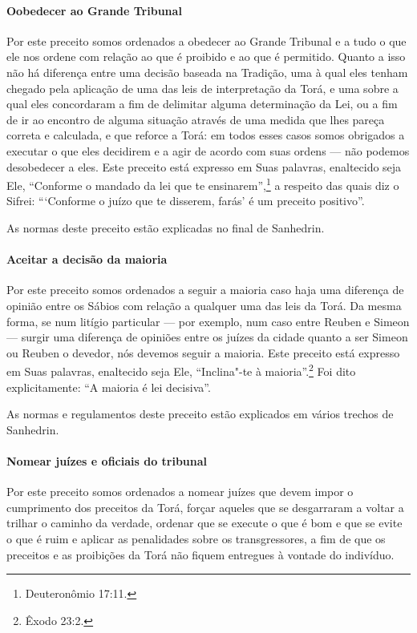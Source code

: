 \begin{multicols}{2}
\paragraph{Oobedecer ao Grande Tribunal}

Por este preceito somos ordenados a obedecer ao Grande Tribunal e a tudo
o que ele nos ordene com relação ao que é proibido e ao que é permitido. Quanto a isso não há diferença entre uma decisão baseada na
Tradição, uma à qual eles tenham chegado pela aplicação de uma das leis
de interpretação da Torá\starr, e uma sobre a qual eles concordaram a fim de
delimitar alguma determinação da Lei, ou a fim de ir ao encontro de
alguma situação através de uma medida que lhes pareça correta e
calculada, e que reforce a Torá\starr: em todos esses casos somos obrigados a
executar o que eles decidirem e a agir de acordo com suas ordens --- não
podemos desobedecer a eles. Este preceito está expresso em Suas
palavras, enaltecido seja Ele, ``Conforme o mandado da lei que te
ensinarem'',\footnote{Deuteronômio 17:11.} a respeito das quais diz o Sifrei\starr:
```Conforme o juízo que te disserem, farás' é um preceito positivo''.

As normas deste preceito estão explicadas no final de Sanhedrin\starr.

\paragraph{Aceitar a decisão da maioria}

Por este preceito somos ordenados a seguir a maioria caso haja uma
diferença de opinião entre os Sábios com relação a qualquer uma das leis
da Torá\starr. Da mesma forma, se num litígio particular --- por exemplo, num
caso entre Reuben e Simeon --- surgir uma diferença de opiniões entre os
juízes da cidade quanto a ser Simeon ou Reuben o devedor, nós devemos
seguir a maioria. Este preceito está expresso em Suas palavras,
enaltecido seja Ele, ``Inclina"-te à maioria''.\footnote{Êxodo 23:2.} Foi dito
explicitamente: ``A maioria é lei decisiva''.

As normas e regulamentos deste preceito estão explicados em vários
trechos de Sanhedrin\starr.

\paragraph{Nomear juízes e oficiais do tribunal}

Por este preceito somos ordenados a nomear juízes que devem impor o
cumprimento dos preceitos da Torá\starr, forçar aqueles que se desgarraram a
voltar a trilhar o caminho da verdade, ordenar que se execute o que é
bom e que se evite o que é ruim e aplicar as penalidades sobre os
transgressores, a fim de que os preceitos e as proibições da Torá\starr{} não
fiquem entregues à vontade do indivíduo.


\end{multicols}
